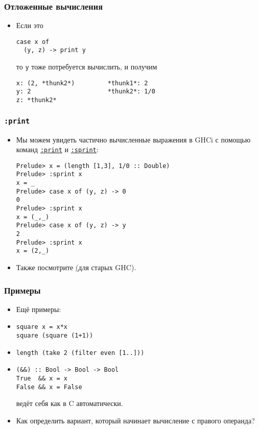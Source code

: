 \documentclass[11pt]{beamer}
\begin{document}
\begin{frame}[fragile]
\frametitle{Отложенные вычисления}
\begin{itemize}
    \item Если это
\begin{lstlisting}[basicstyle=\ttfamily\small]
case x of
  (y, z) -> print y
\end{lstlisting}
то \lstinline|y| тоже потребуется вычислить, и получим \pause
\begin{lstlisting}[basicstyle=\ttfamily\small]
x: (2, *thunk2*)         *thunk1*: 2
y: 2                     *thunk2*: 1/0
z: *thunk2*
\end{lstlisting}
\end{itemize}
\end{frame}

\begin{frame}[fragile]
\frametitle{\lstinline|:print|}
\begin{itemize}
    \item Мы можем увидеть частично вычисленные выражения в GHCi с помощью команд \href{https://downloads.haskell.org/~ghc/8.6.3/docs/html/users_guide/ghci.html#ghci-cmd-:print}{\lstinline|:print|} и \href{https://downloads.haskell.org/~ghc/8.6.3/docs/html/users_guide/ghci.html#ghci-cmd-:sprint}{\lstinline|:sprint|}:
\begin{lstlisting}[basicstyle=\ttfamily\small]
Prelude> x = (length [1,3], 1/0 :: Double)
Prelude> :sprint x
x = _
Prelude> case x of (y, z) -> 0
0
Prelude> :sprint x
x = (_,_)
Prelude> case x of (y, z) -> y
2
Prelude> :sprint x
x = (2,_)
\end{lstlisting}
    \pause
    \item Также посмотрите \href{http://felsin9.de/nnis/ghc-vis/} (для старых GHC).
\end{itemize}
\end{frame}

\begin{frame}[fragile]
\frametitle{Примеры}
\begin{itemize}
    \item Ещё примеры:
    \pause
    \item
\begin{lstlisting}
square x = x*x
square (square (1+1))
\end{lstlisting}
    \item \lstinline|length (take 2 (filter even [1..]))|
\pause
    \item 
\begin{lstlisting}
(&&) :: Bool -> Bool -> Bool
True  && x = x
False && x = False
\end{lstlisting}
    ведёт себя как в C автоматически.
    \pause
    \item Как определить вариант, который начинает вычисление с правого операнда?
\end{itemize}
\end{frame}
\end{document}
